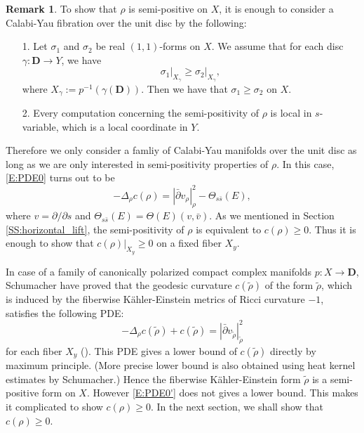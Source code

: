 \documentclass{amsart}
\theoremstyle{definition}
\newtheorem{remark}[theorem]{Remark}
\numberwithin{equation}{section}
\begin{document}
\begin{remark}\label{R:sufficient_condition}
To show that $\rho$ is semi-positive on $X$, it is enough to consider a Calabi-Yau fibration over the unit disc by the following: 
\begin{itemize}
\item [1.] Let $\sigma_1$ and $\sigma_2$ be real $(1,1)$-forms on $X$. We assume that for each  disc $\gamma:{\mathbf{D}}\rightarrow Y$, we have
\begin{equation*}
\sigma_1\vert_{X_\gamma}\ge\sigma_2\vert_{X_\gamma},
\end{equation*}
where $X_\gamma:=p^{-1}(\gamma({\mathbf{D}}))$. Then we have that $\sigma_1\ge\sigma_2$ on $X$.
\item [2.] Every computation concerning the semi-positivity of $\rho$ is local in $s$-variable, which is a local coordinate in $Y$.
\end{itemize}
Therefore we only consider a famliy of Calabi-Yau manifolds over the unit disc as long as we are only interested in semi-positivity properties of $\rho$. In this case, \eqref{E:PDE0} turns out to be
\begin{equation}\label{E:PDE0'}
-\Delta_\rho c(\rho)
=
{\left\vert{\bar\partial v_\rho}\right\vert}_\rho^2-\Theta_{s\bar s}(E),
\end{equation}
where $v=\partial/\partial s$ and $\Theta_{s\bar s}(E)=\Theta(E)(v,\bar v)$. As we mentioned in Section \ref{SS:horizontal_lift}, the semi-positivity of $\rho$ is equivalent to $c(\rho)\ge0$. Thus it is enough to show that $c(\rho)\vert_{X_y}\ge0$ on a fixed fiber $X_y$.

In case of a family of canonically polarized compact complex manifolds $p:X\rightarrow{\mathbf{D}}$, Schumacher have proved that the geodesic curvature $c(\tilde\rho)$ of the form $\tilde\rho$, which is induced by the fiberwise K\"ahler-Einstein metrics of Ricci curvature $-1$, satisfies the following PDE:
\begin{equation*}
-\Delta_\rho c(\tilde\rho)+c(\tilde\rho)
=
{\left\vert{\bar\partial v_{\tilde\rho}}\right\vert}_{\tilde\rho}^2
\end{equation*}
for each fiber $X_y$ (\cite{Schumacher}). This PDE gives a lower bound of $c(\tilde\rho)$ directly by maximum principle. (More precise lower bound is also obtained using heat kernel estimates by Schumacher.) Hence the fiberwise K\"ahler-Einstein form $\tilde\rho$ is a semi-positive form on $X$. However \eqref{E:PDE0'} does not gives a lower bound. This makes it complicated to show $c(\rho)\ge0$. In the next section, we shall show that $c(\rho)\ge0$.
\end{remark}
\end{document}
